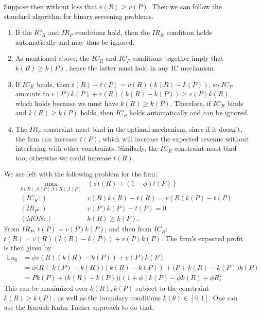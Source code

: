 \documentclass[a4paper]{article}
\begin{document}
\begin{enumerate}
	Suppose then without loss that $v(R) \geq v(P)$. 
	Then we can follow the standard algorithm for binary screening problems.
	\begin{enumerate}
		\item If the $IC_R$ and $IR_P$ conditions hold, then the $IR_R$ condition holds automatically and may thus be ignored.
		
		\item As mentioned above, the $IC_R$ and $IC_P$ conditions together imply that $k(R) \geq k(P)$, hence the latter must hold in any IC mechanism.
		
		\item If $IC_R$ binds, then $t(R)-t(P) = v(R) (k(R)-k(P))$, so $IC_P$ amounts to $v(P)k(P) + v(R) (k(R)-k(P)) \geq v(P)k(R)$, which holds because we must have $k(R) \geq k(P)$. Therefore, if $IC_R$ binds and $k(R) \geq k(P)$ holds, then $IC_P$ holds automatically and can be ignored.
		
		\item The $IR_P$ constraint must bind in the optimal mechanism, since if it doesn't, the firm can increase $t(P)$, which will increase the expected revenue without interfering with other constraints. Similarly, the $IC_R$ constraint must bind too, otherwise we could increase $t(R)$.
	\end{enumerate}
	We are left with the following problem for the firm:
	\begin{align*}
		\max_{k(R),k(P),t(R),t(P)} &\left\{ \phi t(R) + (1-\phi) t(P) \right\} 
		\\
		(IC_R:) \quad &v(R)k(R) - t(R) = v(R)k(P) - t(P) 
		\\
		(IR_P:) \quad &v(P)k(P) - t(P) = 0
		\\
		(MON:)	\quad &k(R) \geq k(P).
	\end{align*}
	From $IR_P$, $t(P) = v(P)k(P)$; and then from $IC_R$: $t(R) = v(R)(k(R)-k(P)) + v(P)k(P)$. The firm's expected profit is then given by
	\begin{align*}
		\mathbb{E}u_0 &= 
		\phi v(R)(k(R)-k(P)) + v(P)k(P) 
		\\
		&= \phi \Big( R + k(P) - k(R) \Big) (k(R)-k(P)) + \Big( P + k(R) - k(P) \Big) k(P)
		\\
		&= P k(P) + \Big( k(R) - k(P) \Big) \Big( (1+\phi)k(P) -\phi k(R) + \phi R \Big)
	\end{align*}
	This can be maximized over $k(R),k(P)$ subject to the constraint $k(R) \geq k(P)$, as well as the boundary conditions $k(\theta) \in [0,1]$. One can use the Karush-Kuhn-Tucker approach to do that.
	

\end{enumerate}
\end{document}
